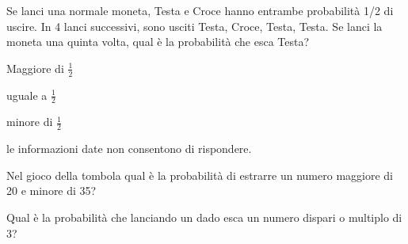 \begin{esercizio} %
Se lanci una normale moneta, Testa e Croce hanno entrambe probabilità 1/2 di 
uscire. In 4 lanci successivi, sono usciti Testa, Croce, Testa, Testa. Se lanci 
la moneta una quinta volta, qual è la probabilità che esca Testa?
\begin{itemize*}
\item Maggiore di $ \frac 1 2 $
\item uguale a $ \frac 1 2 $
\item minore di $ \frac 1 2 $
\item le informazioni date non consentono di rispondere.
\end{itemize*}
\end{esercizio}

\begin{esercizio} %
Nel gioco della tombola qual è la probabilità di estrarre un numero maggiore di 
20 e minore di 35?
\end{esercizio}

\begin{esercizio} %
Qual è la probabilità che lanciando un dado esca un numero dispari o multiplo di 
3?
\end{esercizio}
